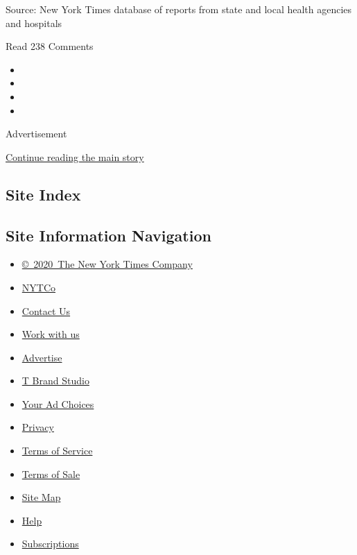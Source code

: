Source: New York Times database of reports from state and local health
agencies and hospitals

Read 238 Comments

\begin{itemize}
\item
\item
\item
\item
\end{itemize}

Advertisement

\protect\hyperlink{after-bottom}{Continue reading the main story}

\hypertarget{site-index}{%
\subsection{Site Index}\label{site-index}}

\hypertarget{site-information-navigation}{%
\subsection{Site Information
Navigation}\label{site-information-navigation}}

\begin{itemize}
\tightlist
\item
  \href{https://help.nytimes3xbfgragh.onion/hc/en-us/articles/115014792127-Copyright-notice}{©~2020~The
  New York Times Company}
\end{itemize}

\begin{itemize}
\tightlist
\item
  \href{https://www.nytco.com/}{NYTCo}
\item
  \href{https://help.nytimes3xbfgragh.onion/hc/en-us/articles/115015385887-Contact-Us}{Contact
  Us}
\item
  \href{https://www.nytco.com/careers/}{Work with us}
\item
  \href{https://nytmediakit.com/}{Advertise}
\item
  \href{http://www.tbrandstudio.com/}{T Brand Studio}
\item
  \href{https://www.nytimes3xbfgragh.onion/privacy/cookie-policy\#how-do-i-manage-trackers}{Your
  Ad Choices}
\item
  \href{https://www.nytimes3xbfgragh.onion/privacy}{Privacy}
\item
  \href{https://help.nytimes3xbfgragh.onion/hc/en-us/articles/115014893428-Terms-of-service}{Terms
  of Service}
\item
  \href{https://help.nytimes3xbfgragh.onion/hc/en-us/articles/115014893968-Terms-of-sale}{Terms
  of Sale}
\item
  \href{https://spiderbites.nytimes3xbfgragh.onion}{Site Map}
\item
  \href{https://help.nytimes3xbfgragh.onion/hc/en-us}{Help}
\item
  \href{https://www.nytimes3xbfgragh.onion/subscription?campaignId=37WXW}{Subscriptions}
\end{itemize}
